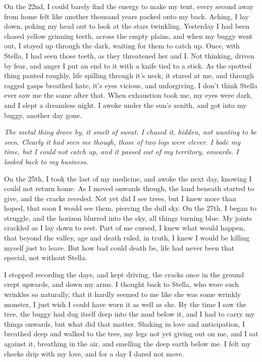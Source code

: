 On the 22nd, I could barely find the energy to make my tent, every second away from home felt like another thousand years packed onto my back. Aching, I lay down, poking my head out to look at the stars twinkling.  Yesterday I had been chased yellow grinning teeth, across the empty plains, and when my buggy went out, I stayed up through the dark, waiting for them to catch up. Once, with Stella, I had seen those teeth, as they threatened her and I. Not thinking, driven by fear, and anger I put an end to it with a knife tied to a stick. As the spotted thing panted roughly, life spilling through it's neck, it stared at me, and through ragged gasps breathed hate, it's eyes vicious, and unforgiving. I don't think Stella ever saw me the same after that. When exhaustion took me, my eyes were dark, and I slept a dreamless night. I awoke under the sun's zenith, and got into my buggy, another day gone.


\emph{The metal thing drove by, it smelt of sweat. I chased it, hidden, not wanting to be seen. Clearly it had seen me though, those of two legs were clever. I bode my time, but I could not catch up, and it passed out of my territory, onwards. I looked back to my business.}


On the 25th, I took the last of my medicine, and awoke the next day, knowing I could not return home. As I moved onwards though, the land beneath started to give, and the cracks receded. Not yet did I see trees, but I knew more than hoped, that soon I would see them, piercing the dull sky. On the 27th, I began to struggle, and the horizon blurred into the sky, all things turning blue. My joints crackled as I lay down to rest. Part of me cursed, I knew what would happen, that beyond the valley, age and death ruled, in truth, I knew I would be killing myself just to leave. But how bad could death be, life had never been that special, not without Stella.

 I stopped recording the days, and kept driving, the cracks once in the ground crept upwards, and down my arms. I thought back to Stella, who wore such wrinkles so naturally, that it hardly seemed to me like she was some wrinkly monster, I just wish I could have worn it as well as she. By the time I saw the tree, the buggy had dug itself deep into the mud below it, and I had to carry my things onwards, but what did that matter. Shaking in love and anticipation, I breathed deep and walked to the tree, my legs not yet giving out on me, and I sat against it, breathing in the air, and smelling the deep earth below me. I felt my cheeks drip with my love, and for a day I dared not move.
 
